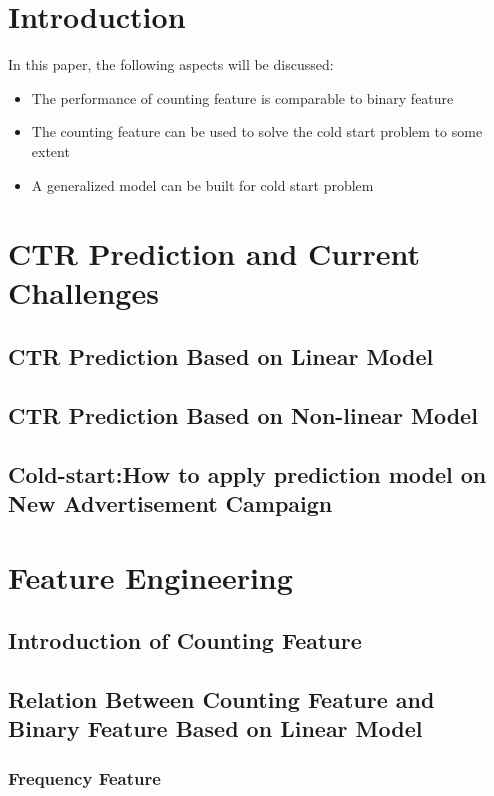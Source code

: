 \documentclass{sig-alternate}
\begin{document}

\keywords{}

\section{Introduction}
In this paper, the following aspects will be discussed:

\begin{itemize}
\item The performance of counting feature is comparable to binary feature
\item The counting feature can be used to solve the cold start problem to some extent
\item A generalized model can be built for cold start problem
\end{itemize}

\section{CTR Prediction and Current Challenges}

\subsection{CTR Prediction Based on Linear Model}
\subsection{CTR Prediction Based on Non-linear Model}
\subsection{Cold-start:How to apply prediction model on New Advertisement Campaign}

\section{Feature Engineering}
\subsection{Introduction of Counting Feature}
\subsection{Relation Between Counting Feature and Binary Feature Based on Linear Model}
\subsubsection{Frequency Feature}
\setlength{\parindent}{5ex}
\end{document}
